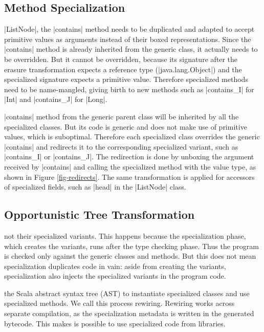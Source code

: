 \subsection{Method Specialization}
\label{subsec-spec-method}

 |ListNode|, the |contains| method needs to be duplicated and adapted to accept primitive values as arguments instead of their boxed representations. Since the |contains| method is already inherited from the generic class, it actually needs to be overridden. But it cannot be overridden, because its signature after the erasure \cite{java-erasure} transformation expects a reference type (|java.lang.Object|) and the specialized signature expects a primitive value. Therefore specialized methods need to be name-mangled, giving birth to new methods such as |contains_I| for |Int| and |contains_J| for |Long|.

 |contains| method from the generic parent class will be inherited by all the specialized classes. But its code is generic and does not make use of primitive values, which is suboptimal. Therefore each specialized class overrides the generic |contains| and redirects it to the corresponding specialized variant, such as |contains_I| or |contains_J|. The redirection is done by unboxing the argument received by |contains| and calling the specialized method with the value type, as shown in Figure \ref{fig-redirects}. The same transformation is applied for accessors of specialized fields, such as |head| in the |ListNode| class.

\subsection{Opportunistic Tree Transformation}
\label{subsec-spec-rewiring}

 not their specialized variants. This happens because the specialization phase, which creates the variants, runs after the type checking phase. Thus the program is checked only against the generic classes and methods. But this does not mean specialization duplicates code in vain: aside from creating the variants, specialization also injects the specialized variants in the program code.

 the Scala abstract syntax tree (AST) to instantiate specialized classes and use specialized methods. We call this process rewiring. Rewiring works across separate compilation, as the specialization metadata is written in the generated bytecode. This makes is possible to use specialized code from libraries.

